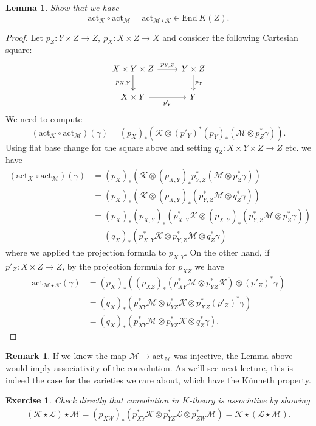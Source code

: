 \documentclass[11pt]{amsart}
\newtheorem{lemma}[dummy]{Lemma}
\newtheorem{exercise}[dummy]{Exercise}
\theoremstyle{definition}
\newtheorem{remark}[dummy]{Remark}
\newcommand{\Kc}{\mathcal{K}}
\newcommand{\Mca}{\mathcal{M}}
\newcommand{\End}{\mathrm{End}}
\newcommand{\act}{\mathrm{act}}
\numberwithin{equation}{subsection}
\numberwithin{figure}{subsection}
\begin{document}
\begin{lemma}
Show that we have 
$$
\act_\Kc \circ \act_\Mca = \act_{\Mca\star\Kc}\in \End ~K(Z).
$$
\end{lemma}
\begin{proof}
Let 
$p_Z:Y\times Z\rightarrow Z,~p_X:X\times Z\rightarrow X$ and consider  the following Cartesian square:
$$
\begin{tikzcd}
X\times Y \times Z\arrow{r}{p_{Y,Z}} \arrow[swap]{d}{p_{X,Y}}& Y\times Z \arrow{d}{p_Y} \\
X\times Y\arrow[swap]{r}{p'_{Y}} & Y
\end{tikzcd}
$$
We need to compute
$$
(\act_\Kc \circ \act_\Mca)(\gamma) = (p_X)_*\left(\Kc\otimes (p'_Y)^*(p_Y)_*\left(\Mca\otimes p_Z^*\gamma\right) \right).
$$
Using flat base change for the square above and setting $q_Z:X\times Y\times Z\rightarrow Z$ etc. we have
\begin{align*}
(\act_\Kc \circ \act_\Mca)(\gamma) &= (p_X)_*\left(\Kc\otimes (p_{X,Y})_*p_{Y,Z}^*\left(\Mca\otimes p_Z^*\gamma\right) \right)\\
&=(p_X)_*\left(\Kc\otimes (p_{X,Y})_*\left(p_{Y,Z}^*\Mca\otimes q_Z^*\gamma\right) \right)\\
&=(p_X)_*(p_{X,Y})_*\left(p_{X,Y}^*\Kc\otimes (p_{X,Y})_*\left(p_{Y,Z}^*\Mca\otimes p_Z^*\gamma\right) \right)\\
&=(q_X)_*\left(p_{X,Y}^*\Kc\otimes p_{Y,Z}^*\Mca\otimes q_Z^*\gamma \right)
\end{align*}
where we applied the projection formula to $p_{X,Y}$. 
On the other hand, if $p'_Z:X\times Z\rightarrow Z$, by the projection formula for $p_{XZ}$ we have
\begin{align*}
\act_{\Mca\star \Kc}(\gamma) &=(p_X)_*\left( (p_{XZ})_*(p_{XY}^*\Mca\otimes p_{YZ}^*\Kc)\otimes (p'_Z)^*\gamma\right)\\
&=(q_X)_*\left( p_{XY}^*\Mca\otimes p_{YZ}^*\Kc\otimes p_{XZ}^*(p'_Z)^*\gamma\right)\\
&=(q_X)_*\left( p_{XY}^*\Mca\otimes p_{YZ}^*\Kc\otimes q_Z^*\gamma\right).
\end{align*}
\end{proof}
\begin{remark}
If we knew the map $\Mca\rightarrow \act_\Mca$ was injective, the Lemma above would imply associativity of the convolution.  As we'll see next lecture, this is indeed the case for the varieties we care about, which have the K\"unneth property.
\end{remark}
\begin{exercise}
Check directly that convolution in $K$-theory is associative by showing 
\begin{align}
\label{eq:conv-assoc}
(\Kc\star\mathcal{L})\star\Mca = (p_{XW})_*\left(p_{XY}^*\Kc\otimes p_{YZ}^*\mathcal{L}\otimes p_{ZW}^*\Mca\right)=\Kc\star(\mathcal{L}\star\Mca).
\end{align}
\end{exercise}
\end{document}
